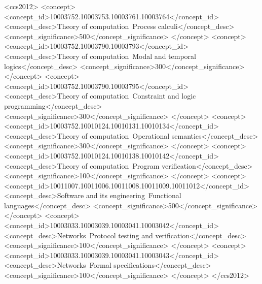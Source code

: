 \documentclass[sigplan,10pt,review]{acmart}\settopmatter{printfolios=true}
\begin{document}
\begin{CCSXML}
<ccs2012>
<concept>
<concept_id>10003752.10003753.10003761.10003764</concept_id>
<concept_desc>Theory of computation~Process calculi</concept_desc>
<concept_significance>500</concept_significance>
</concept>
<concept>
<concept_id>10003752.10003790.10003793</concept_id>
<concept_desc>Theory of computation~Modal and temporal logics</concept_desc>
<concept_significance>300</concept_significance>
</concept>
<concept>
<concept_id>10003752.10003790.10003795</concept_id>
<concept_desc>Theory of computation~Constraint and logic programming</concept_desc>
<concept_significance>300</concept_significance>
</concept>
<concept>
<concept_id>10003752.10010124.10010131.10010134</concept_id>
<concept_desc>Theory of computation~Operational semantics</concept_desc>
<concept_significance>300</concept_significance>
</concept>
<concept>
<concept_id>10003752.10010124.10010138.10010142</concept_id>
<concept_desc>Theory of computation~Program verification</concept_desc>
<concept_significance>100</concept_significance>
</concept>
<concept>
<concept_id>10011007.10011006.10011008.10011009.10011012</concept_id>
<concept_desc>Software and its engineering~Functional languages</concept_desc>
<concept_significance>500</concept_significance>
</concept>
<concept>
<concept_id>10003033.10003039.10003041.10003042</concept_id>
<concept_desc>Networks~Protocol testing and verification</concept_desc>
<concept_significance>100</concept_significance>
</concept>
<concept>
<concept_id>10003033.10003039.10003041.10003043</concept_id>
<concept_desc>Networks~Formal specifications</concept_desc>
<concept_significance>100</concept_significance>
</concept>
</ccs2012>
\end{CCSXML}



\end{document}
